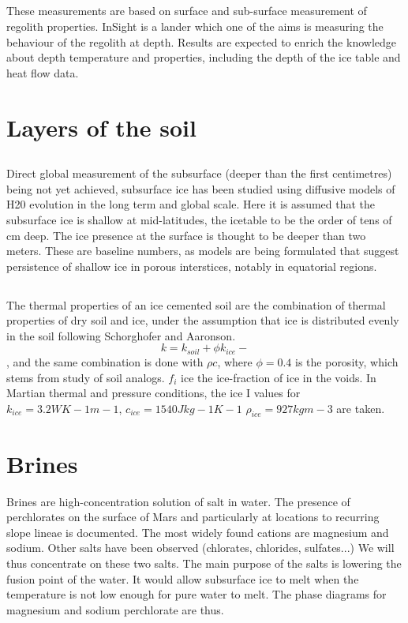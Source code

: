\documentclass{report}
\begin{document}
    \subsection{}
    These measurements are based on surface and sub-surface measurement of regolith properties. InSight is a lander which one of the aims is measuring the behaviour of the regolith at depth. Results are expected to enrich the knowledge about depth temperature and properties, including the depth of the ice table and heat flow data. 

\section{Layers of the soil}
    \subsection{}
    Direct global measurement of the subsurface (deeper than the first centimetres) being not yet achieved, subsurface ice has been studied using diffusive models of H20 evolution in the long term and global scale. Here it is assumed that the subsurface ice is shallow at mid-latitudes, the icetable to be the order of tens of cm deep. The ice presence at the surface is thought to be deeper than two meters. 
    These are baseline numbers, as models are being formulated that suggest persistence of shallow ice in porous interstices, notably in equatorial regions.
    
    \subsection{}
    The thermal properties of an ice cemented soil are the combination of thermal properties of dry soil and ice, under the assumption that ice is distributed evenly in the soil following Schorghofer and Aaronson. 
    \[k = k_{soil} + \phi k_{ice}-\],
    and the same combination is done with $\rho c$, where $\phi = 0.4$ is the porosity, which stems from study of soil analogs. $f_i$ ice the ice-fraction of ice in the voids. In Martian thermal and pressure conditions, the ice I values for $k_{ice}=3.2WK-1m-1 $, $c_{ice} = 1540 J kg-1K-1$ $\rho _{ice}=927 kg m-3$ are taken.
    
\section{Brines}
    Brines are high-concentration solution of salt in water. The presence of perchlorates on the surface of Mars and particularly at locations to recurring slope lineae is documented. The most widely found cations are magnesium and sodium.
    Other salts have been observed (chlorates, chlorides, sulfates...)
    We will thus concentrate on these two salts. 
    The main purpose of the salts is lowering the fusion point of the water. It would allow subsurface ice to melt when the temperature is not low enough for pure water to melt. The phase diagrams for magnesium and sodium perchlorate are thus. 
    
\end{document}
